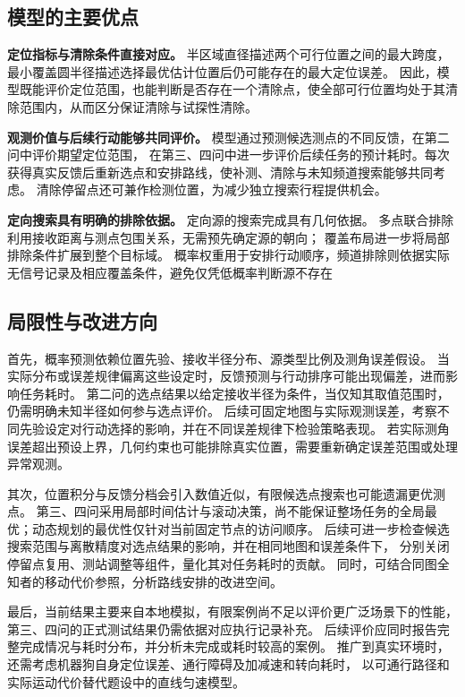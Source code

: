 \documentclass[UTF8,a4paper,12pt]{ctexart}
\begin{document}
\subsection{模型的主要优点}

\textbf{定位指标与清除条件直接对应。}
半区域直径描述两个可行位置之间的最大跨度，最小覆盖圆半径描述选择最优估计位置后仍可能存在的最大定位误差。
因此，模型既能评价定位范围，也能判断是否存在一个清除点，使全部可行位置均处于其清除范围内，从而区分保证清除与试探性清除。

\textbf{观测价值与后续行动能够共同评价。}
模型通过预测候选测点的不同反馈，在第二问中评价期望定位范围，
在第三、四问中进一步评价后续任务的预计耗时。每次获得真实反馈后重新选点和安排路线，使补测、清除与未知频道搜索能够共同考虑。
清除停留点还可兼作检测位置，为减少独立搜索行程提供机会。

\textbf{定向搜索具有明确的排除依据。}
定向源的搜索完成具有几何依据。
多点联合排除利用接收距离与测点包围关系，无需预先确定源的朝向；
覆盖布局进一步将局部排除条件扩展到整个目标域。
概率权重用于安排行动顺序，频道排除则依据实际无信号记录及相应覆盖条件，避免仅凭低概率判断源不存在

\subsection{局限性与改进方向}

首先，概率预测依赖位置先验、接收半径分布、源类型比例及测角误差假设。
当实际分布或误差规律偏离这些设定时，反馈预测与行动排序可能出现偏差，进而影响任务耗时。
第二问的选点结果以给定接收半径为条件，当仅知其取值范围时，仍需明确未知半径如何参与选点评价。
后续可固定地图与实际观测误差，考察不同先验设定对行动选择的影响，并在不同误差规律下检验策略表现。
若实际测角误差超出预设上界，几何约束也可能排除真实位置，需要重新确定误差范围或处理异常观测。

其次，位置积分与反馈分档会引入数值近似，有限候选点搜索也可能遗漏更优测点。
第三、四问采用局部时间估计与滚动决策，尚不能保证整场任务的全局最优；动态规划的最优性仅针对当前固定节点的访问顺序。
后续可进一步检查候选搜索范围与离散精度对选点结果的影响，并在相同地图和误差条件下，
分别关闭停留点复用、测站调整等组件，量化其对任务耗时的贡献。
同时，可结合同图全知者的移动代价参照，分析路线安排的改进空间。

最后，当前结果主要来自本地模拟，有限案例尚不足以评价更广泛场景下的性能，第三、四问的正式测试结果仍需依据对应执行记录补充。
后续评价应同时报告完整完成情况与耗时分布，并分析未完成或耗时较高的案例。
推广到真实环境时，还需考虑机器狗自身定位误差、通行障碍及加减速和转向耗时，
以可通行路径和实际运动代价替代题设中的直线匀速模型。
\end{document}

